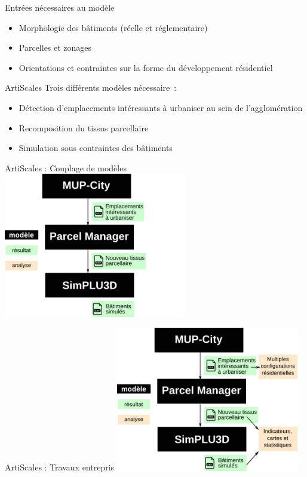 \documentclass[xcolor=table]{beamer}
\begin{document}
\begin{frame}{Entrées nécessaires au modèle}
	\begin{block}{}
		\begin{itemize}
			\item Morphologie des bâtiments (réelle et réglementaire)
			\item Parcelles et zonages
			\item Orientations et contraintes sur la forme du développement résidentiel
		\end{itemize}
	\end{block}
\end{frame}

\begin{frame}{ArtiScales}
	Trois différents modèles nécessaire~:
	\begin{itemize}
		\item Détection d'emplacements intéressants à urbaniser au sein de l'agglomération
		\item Recomposition du tissus parcellaire
		\item Simulation sous contraintes des bâtiments
	\end{itemize}
\end{frame}



\begin{frame}{ArtiScales : Couplage de modèles}
	\centering
	\includegraphics[width=8cm]{Images/schemGenPrez0.png}
\end{frame}


\begin{frame}{ArtiScales : Travaux entrepris}
	\centering
	\includegraphics[width=8cm]{Images/schemGenPrez1.png}
\end{frame}
\end{document}
